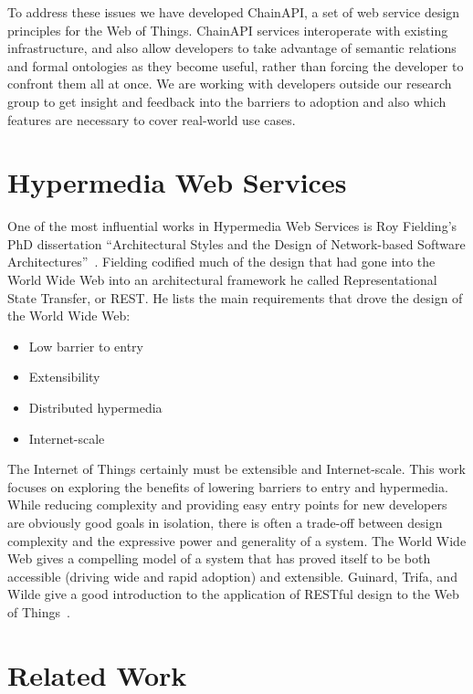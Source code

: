 \documentclass{acm_proc_article-sp}
\newenvironment{tightitemize}{
    \vspace{-10pt}
    \begin{itemize}
        \setlength{\parskip}{-1pt}}{
    \end{itemize}
    \vspace{-10pt}}
\begin{document}
To address these issues we have developed ChainAPI, a set of web service design
principles for the Web of Things. ChainAPI services interoperate with existing
infrastructure, and also allow developers to take advantage of semantic
relations and formal ontologies as they become useful, rather than forcing the
developer to confront them all at once. We are working with developers outside
our research group to get insight and feedback into the barriers to adoption
and also which features are necessary to cover real-world use cases.

\section{Hypermedia Web Services}

One of the most influential works in Hypermedia Web Services is Roy Fielding's
PhD dissertation ``Architectural Styles and the Design of Network-based
Software Architectures''~\cite{fielding}. Fielding codified much of the design
that had gone into the World Wide Web into an architectural framework he called
Representational State Transfer, or REST. He lists the main requirements that
drove the design of the World Wide Web:

\begin{tightitemize}
    \item Low barrier to entry
    \item Extensibility
    \item Distributed hypermedia
    \item Internet-scale
\end{tightitemize}

The Internet of Things certainly must be extensible and Internet-scale. This
work focuses on exploring the benefits of lowering barriers to entry and
hypermedia. While reducing complexity and providing easy entry points for new
developers are obviously good goals in isolation, there is often a trade-off
between design complexity and the expressive power and generality of a system.
The World Wide Web gives a compelling model of a system that has
proved itself to be both accessible (driving wide and rapid adoption) and
extensible. Guinard, Trifa, and Wilde give a good introduction to the
application of RESTful design to the Web of Things~\cite{guinard2010}.

\section{Related Work}
\end{document}
